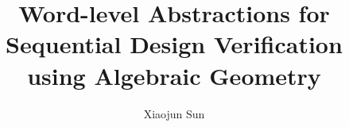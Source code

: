 \documentclass[Chicago]{uuthesis2e}
\title{Word-level Abstractions for Sequential Design Verification using Algebraic Geometry}
\author{Xiaojun Sun}
\newcommand{\ls}[1]
    {\dimen0=\fontdimen6\the\font
     \lineskip=#1\dimen0
     \advance\lineskip.5\fontdimen5\the\font
     \advance\lineskip-\dimen0
     \lineskiplimit=.9\lineskip
     \baselineskip=\lineskip
     \advance\baselineskip\dimen0
     \normallineskip\lineskip
     \normallineskiplimit\lineskiplimit
     \normalbaselineskip\baselineskip
     \ignorespaces
    }
\begin{document}

\frontmatterformat
\titlepage
\copyrightpage
\committeeapproval
\readingapproval

\tableofcontents
\listoffigures
\listoftables


\maintext       %




%













\end{document}
